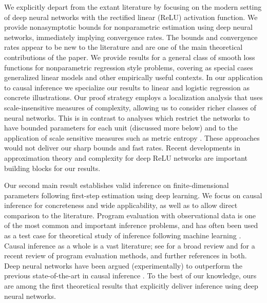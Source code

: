 \documentclass[11pt]{article}
\numberwithin{equation}{section}
\theoremstyle{definition}
\begin{document}
We explicitly depart from the extant literature by focusing on the modern setting of deep neural networks with the rectified linear (ReLU) activation function. We provide nonasymptotic bounds for nonparametric estimation using deep neural networks, immediately implying convergence rates.  The bounds and convergence rates appear to be new to the literature and are one of the main theoretical contributions of the paper. We provide results for a general class of smooth loss functions for nonparametric regression style problems, covering as special cases generalized linear models and other empirically useful contexts. In our application to causal inference we specialize our results to linear and logistic regression as concrete illustrations. Our proof strategy employs a localization analysis that uses scale-insensitive measures of complexity, allowing us to consider richer classes of neural networks. This is in contrast to analyses which restrict the networks to have bounded parameters for each unit (discussed more below) and to the application of scale sensitive measures such as metric entropy \citep[used by][for example]{Chen-White1999_IEEE}. These approaches would not deliver our sharp bounds and fast rates. Recent developments in approximation theory and complexity for deep ReLU networks are important building blocks for our results. 





Our second main result establishes valid inference on finite-dimensional parameters following first-step estimation using deep learning. We focus on causal inference for concreteness and wide applicability, as well as to allow direct comparison to the literature. Program evaluation with observational data is one of the most common and important inference problems, and has often been used as a test case for theoretical study of inference following machine learning \citep[e.g.,][]{Belloni-Chernozhukov-Hansen2014_REStud,Farrell2015_arXiv,Belloni-etal2017_Ecma,Athey-Imbens-Wager2018_JRSSB}. Causal inference as a whole is a vast literature; see \cite{Imbens-Rubin2015_book} for a broad review and \cite{Abadie-Cattaneo2018_ARE} for a recent review of program evaluation methods, and further references in both. Deep neural networks have been argued (experimentally) to outperform the previous state-of-the-art in causal inference \citep{westreich2010propensity,johansson2016learning,shalit2017estimating,hartford2017deep}. To the best of our knowledge, ours are among the first theoretical results that explicitly deliver inference using deep neural networks. 
\end{document}
